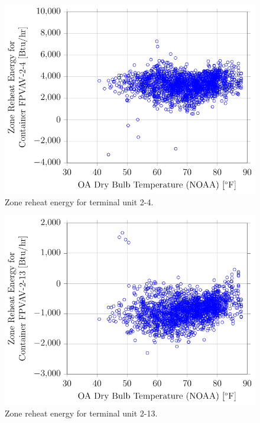 \begin{figure}
\centering
\includegraphics[]{Plots/2016-10-19-1438-ZoneReheatEnergyforContainerFPVAV24vsOADryBulbTemperatureNOAA.pdf}
\caption{Zone reheat energy for terminal unit 2-4.}
\label{fig:2016-10-19-1438-ZoneReheatEnergyforContainerFPVAV24vsOADryBulbTemperatureNOAA}
\end{figure}

\begin{figure}
\centering
\includegraphics[]{Plots/2016-10-19-1521-ZoneReheatEnergyforContainerFPVAV213vsOADryBulbTemperatureNOAA.pdf}
\caption{Zone reheat energy for terminal unit 2-13.}
\label{fig:2016-10-19-1521-ZoneReheatEnergyforContainerFPVAV213vsOADryBulbTemperatureNOAA}
\end{figure}

